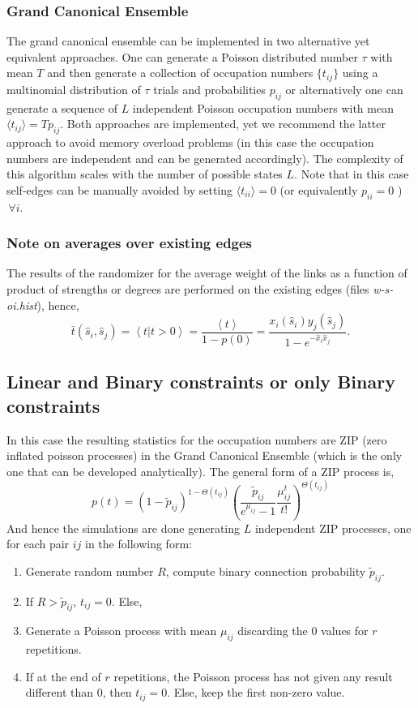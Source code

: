 \documentclass[aps,floatfix,noshowpacs,superscriptaddress]{revtex4}
\newcommand{\ave}[1]{\left \langle #1 \right \rangle}
\begin{document}
\subsubsection{Grand Canonical Ensemble}
The grand canonical ensemble can be implemented in two alternative yet equivalent approaches. One can generate a Poisson distributed number $\tau$ with mean $T$ and then generate a collection of occupation numbers $\{t_{ij}\}$ using a multinomial distribution of $\tau$ trials and probabilities $p_{ij}$ or alternatively one can generate a sequence of $L$ independent Poisson occupation numbers with mean $\langle t_{ij} \rangle = Tp_{ij}$. Both approaches are implemented, yet we recommend the latter approach to avoid memory overload problems (in this case the occupation numbers are independent and can be generated accordingly). The complexity of this algorithm scales with the number of possible states $L$. Note that in this case self-edges can be manually avoided by setting $\langle t_{ii} \rangle = 0$ (or equivalently $p_{ii} = 0$ ) $\, \forall i$.


\subsubsection{Note on averages over existing edges}
The results of the randomizer for the average weight of the links as a function of product of strengths or degrees are performed on the existing edges (files \textit{w-s-oi.hist}), hence,
\[
\bar{t} (\hat{s}_i,\hat{s}_j)= \ave{t | t>0 } = \frac{\ave{t}}{1-p(0)} = \frac{x_i(\hat{s}_i) y_j(\hat{s}_j)}{1-e^{-\hat{x}_i \hat{x}_j }}.
\]



\subsection{Linear and Binary constraints or only Binary constraints}

In this case the resulting statistics for the occupation numbers are ZIP (zero inflated poisson processes) in the Grand Canonical Ensemble (which is the only one that can be developed analytically). The general form of a ZIP process is,
\[
p(t) = (1-\tilde{p}_{ij})^{1-\Theta(t_{ij})} \left(\frac{\tilde{p}_{ij}}{e^{\mu_{ij}} -1} \frac{\mu_{ij}^t}{t!} \right)^{\Theta(t_{ij})}
\]
And hence the simulations are done generating $L$ independent ZIP processes, one for each pair $ij$ in the following form:
\begin{enumerate}
\item Generate random number $R$, compute binary connection probability $\tilde{p}_{ij}$.
\item If $R>\tilde{p}_{ij}$, $t_{ij}=0$. Else,
\item Generate a Poisson process with mean $\mu_{ij}$ discarding the 0 values for $r$ repetitions.
\item If at the end of $r$ repetitions, the Poisson process has not given any result different than 0, then $t_{ij}=0$. Else, keep the first non-zero value.
\end{enumerate}
\end{document}

